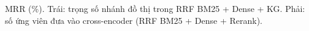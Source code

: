 MRR (\%). Trái: trọng số nhánh đồ thị trong RRF BM25 + Dense + KG. Phải: số ứng viên đưa vào cross-encoder (RRF BM25 + Dense + Rerank).
